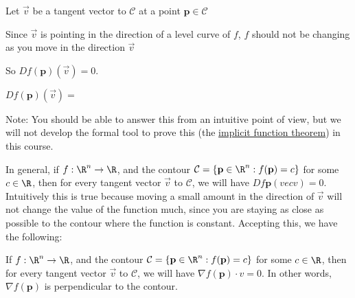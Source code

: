 \documentclass{ximera}
\begin{document}

\begin{question}
	Let $\vec{v}$ be a tangent vector to $\mathcal{C}$ at a point $\mathbf{p} \in \mathcal{C}$ 
	\begin{solution}
		\begin{hint}
			Since $\vec{v}$ is pointing in the direction of a level curve of $f$, $f$ should not be changing as you move in the direction $\vec{v}$
		\end{hint}
		\begin{hint}
			So $Df(\mathbf{p})(\vec{v}) = 0$.
		\end{hint}
		$Df(\mathbf{p})(\vec{v}) = $ 
		
		Note:  You should be able to answer this from an intuitive point of view, but we will not develop the formal tool to prove this 
	(the \href{http://en.wikipedia.org/wiki/Implicit_function_theorem}{implicit function theorem}) in this course.
	\end{solution}
	
	
\end{question}

In general, if $f:\R^n \to \R$, and the contour $\mathcal{C} = \{ \mathbf{p} \in \R^n :  f(\mathbf{p}) = c \}$ for some $c \in \R$, then for every tangent 
vector $\vec{v}$ to $\mathcal{C}$, we will have $Df{\mathbf{p}}(vec{v}) =0$.  
Intuitively this is true because moving a small amount in the direction of $\vec{v}$ will not change the value of the function much,
 since you are staying as close as possible to the contour where the function is constant.  Accepting this, we have the following:
 
 \begin{theorem}
  	If $f:\R^n \to \R$, and the contour $\mathcal{C} = \{ \mathbf{p} \in \R^n :  f(\mathbf{p}) = c \}$ for some $c \in \R$, then for every tangent 
vector $\vec{v}$ to $\mathcal{C}$, we will have $\nabla f(\mathbf{p}) \cdot v  =0$.  In other words, $\nabla f(\mathbf{p})$ is perpendicular to the 
contour.
 \end{theorem}
 
 
\end{document}
